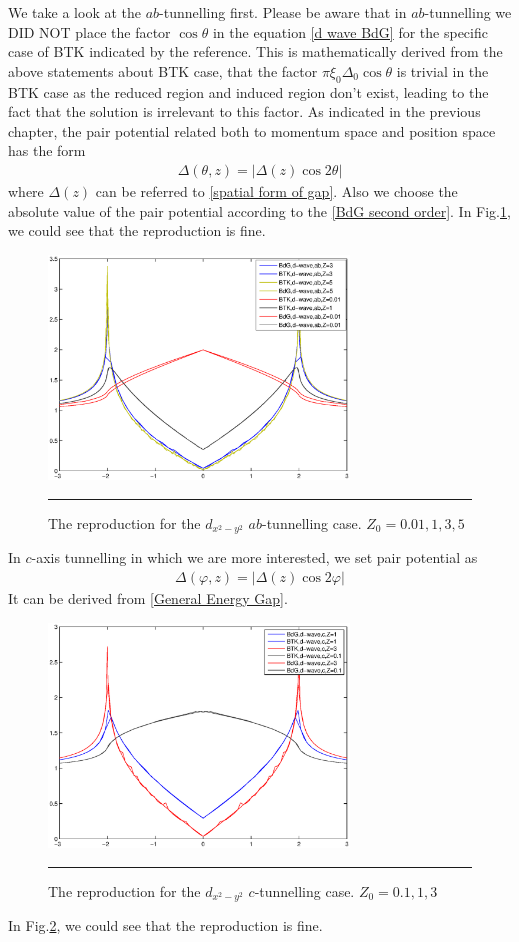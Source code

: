 We take a look at the $ab$-tunnelling first. Please be aware that in $ab$-tunnelling we DID NOT place the factor $\cos\theta$ in the equation \eqref{d wave BdG} for the specific case of BTK indicated by the reference\citep{Reference2}. This is mathematically derived from the above statements about BTK case, that the factor $\pi\xi_0\Delta_0\cos\theta$ is trivial in the BTK case as the reduced region and induced region don't exist, leading to the fact that the solution is irrelevant to this factor. As indicated in the previous chapter, the pair potential related both to momentum space and position space has the form
\begin{eqnarray}\label{ab momentum position}
\Delta(\theta,z)=|\Delta(z)\cos2\theta|
\end{eqnarray}
where $\Delta(z)$ can be referred to \eqref{spatial form of gap}. Also we choose the absolute value of the pair potential according to the \eqref{BdG second order}. In Fig.\ref{BdGdwaveab}, we could see that the reproduction is fine.
\begin{figure}[htbp]
\small
	\centering
		\includegraphics[width=8cm]{./Figures/BdGdwaveab.eps}
		\rule{35em}{0.5pt}
	\caption[An Electron]{The reproduction for the $d_{x^2-y^2}$ $ab$-tunnelling case. $Z_0=0.01,1,3,5$}
	\label{BdGdwaveab}
\end{figure}

In $c$-axis tunnelling in which we are more interested, we set pair potential as
\begin{eqnarray}\label{c momentum position}
\Delta(\varphi,z)=|\Delta(z)\cos2\varphi|
\end{eqnarray}
It can be derived from \eqref{General Energy Gap}. 
\begin{figure}[htbp]
\small
	\centering
		\includegraphics[width=8cm]{./Figures/Dcz.eps}
		\rule{35em}{0.5pt}
	\caption[An Electron]{The reproduction for the $d_{x^2-y^2}$ $c$-tunnelling case. $Z_0=0.1,1,3$}
	\label{Dcz}
\end{figure}
In Fig.\ref{Dcz}, we could see that the reproduction is fine.

